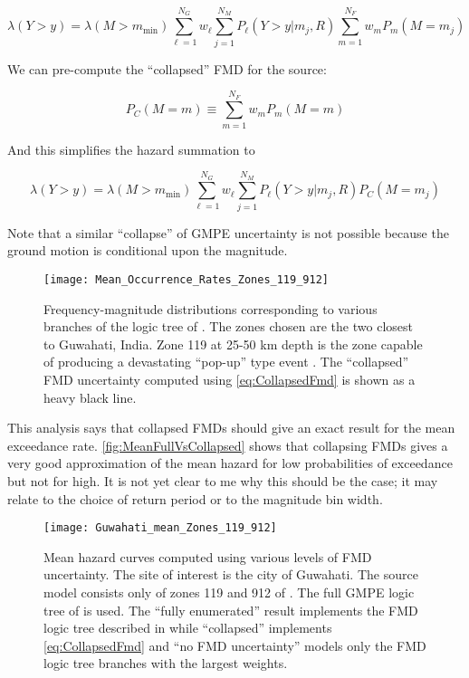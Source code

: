 \documentclass{article}
\begin{document}
$$ \lambda(Y > y) = 
\lambda(M > m_\text{min}) 
\sum_{\ell=1}^{N_G} w_\ell 
\sum_{j=1}^{N_M} 
P_\ell(Y > y|m_j,R) 
\sum_{m=1}^{N_F} w_m 
P_m(M=m_j) $$

We can pre-compute the ``collapsed'' FMD for the source:

$$ P_C(M=m) \equiv \sum_{m=1}^{N_F} w_m P_m(M=m) $$

And this simplifies the hazard summation to

$$ \lambda(Y > y) = 
\lambda(M > m_\text{min}) 
\sum_{\ell=1}^{N_G} w_\ell 
\sum_{j=1}^{N_M} 
P_\ell(Y > y|m_j,R) 
P_C(M=m_j) $$

Note that a similar ``collapse'' of GMPE uncertainty is not possible because the ground motion is conditional upon the magnitude.

\begin{figure}[!htb]
\begin{adjustbox}{center}
\texttt{[image: Mean\_Occurrence\_Rates\_Zones\_119\_912]}
\end{adjustbox}
\caption[Frequency-magnitude distributions for two zones nearest to Guwahati, India]{Frequency-magnitude distributions corresponding to various branches of the logic tree of \cite{nath2012probabilistic}. 
The zones chosen are the two closest to Guwahati, India. 
Zone 119 at 25-50 km depth is the zone capable of producing a devastating ``pop-up'' type event \citep{Bilham2001, nath2012ground}. 
The ``collapsed'' FMD uncertainty computed using \eqref{eq:CollapsedFmd} is shown as a heavy black line.} 
\label{fig:CollapsedFmd}
\end{figure}

This analysis says that collapsed FMDs should give an exact result for the mean exceedance rate. 
\autoref{fig:MeanFullVsCollapsed} shows that collapsing FMDs gives a very good approximation of the mean hazard for low probabilities of exceedance but not for high. 
It is not yet clear to me why this should be the case; it may relate to the choice of return period or to the magnitude bin width. 

\begin{figure}[!htb]
\begin{adjustbox}{center}
\texttt{[image: Guwahati\_mean\_Zones\_119\_912]}
\end{adjustbox}
\caption[Mean hazard curves computed using various levels of FMD uncertainty]{Mean hazard curves computed using various levels of FMD uncertainty. 
The site of interest is the city of Guwahati. 
The source model consists only of zones 119 and 912 of \cite{nath2012probabilistic}. 
The full GMPE logic tree of \cite{nath2012probabilistic} is used. 
The ``fully enumerated'' result implements the FMD logic tree described in \cite{nath2012probabilistic} while ``collapsed'' implements \eqref{eq:CollapsedFmd} and ``no FMD uncertainty'' models only the FMD logic tree branches with the largest weights.} 
\label{fig:MeanFullVsCollapsed}
\end{figure}
\end{document}
